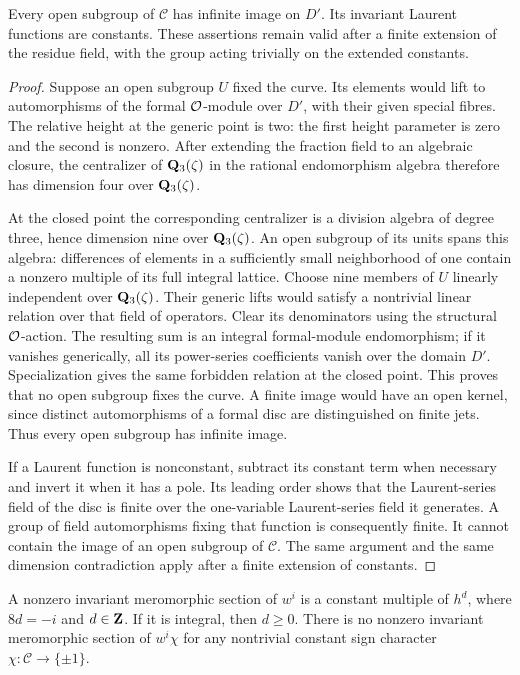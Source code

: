 \begin{lemma}\label{coef:infinite-action}
Every open subgroup of \(\mathcal C\) has infinite image on \(D'\).
Its invariant Laurent functions are constants.  These assertions
remain valid after a finite extension of the residue field, with
the group acting trivially on the extended constants.
\end{lemma}

\begin{proof}
Suppose an open subgroup \(U\) fixed the curve.
Its elements would lift to automorphisms of the formal
\(\mathcal O\)-module over \(D'\), with their given special fibres.
The relative height at the generic point is two:
the first height parameter is zero and the second is nonzero.
After extending the fraction field to an algebraic closure, the
centralizer of \(\mathbf Q_3(\zeta)\) in the rational endomorphism algebra
therefore has dimension four over \(\mathbf Q_3(\zeta)\).

At the closed point the corresponding centralizer is a division
algebra of degree three, hence dimension nine over \(\mathbf Q_3(\zeta)\).
An open subgroup of its units spans this algebra: differences of
elements in a sufficiently small neighborhood of one contain a
nonzero multiple of its full integral lattice.
Choose nine members of \(U\) linearly independent over
\(\mathbf Q_3(\zeta)\).
Their generic lifts would satisfy a nontrivial linear relation
over that field of operators.  Clear its denominators using the
structural \(\mathcal O\)-action.  The resulting sum is an integral
formal-module endomorphism; if it vanishes generically, all its
power-series coefficients vanish over the domain \(D'\).
Specialization gives the same forbidden relation at the closed
point.  This proves that no open subgroup fixes the curve.
A finite image would have an open kernel, since distinct
automorphisms of a formal disc are distinguished on finite jets.
Thus every open subgroup has infinite image.

If a Laurent function is nonconstant, subtract its constant term
when necessary and invert it when it has a pole.  Its leading order
shows that the Laurent-series field of the disc is finite over the
one-variable Laurent-series field it generates.  A group of field
automorphisms fixing that function is consequently finite.
It cannot contain the image of an open subgroup of \(\mathcal C\).
The same argument and the same dimension contradiction apply after
a finite extension of constants.
\end{proof}

\begin{lemma}\label{coef:hasse-powers}
A nonzero invariant meromorphic section of \(w^i\) is a constant
multiple of \(h^d\), where \(8d=-i\) and \(d\in\mathbf Z\).
If it is integral, then \(d\ge0\).
There is no nonzero invariant meromorphic section of \(w^i\chi\)
for any nontrivial constant sign character
\(\chi:\mathcal C\to\{\pm1\}\).
\end{lemma}

